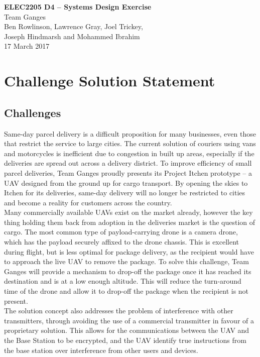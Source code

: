 \documentclass[a4paper,11pt]{article}
\begin{document}
  
\begin{center}
{\Large{\textbf{ELEC2205 D4 -- Systems Design Exercise}}} \\ [\baselineskip]
Team Ganges \\
Ben Rowlinson, Lawrence Gray, Joel Trickey,\\ Joseph Hindmarsh and Mohammed Ibrahim\\
17 March 2017\\
\end{center}

\tableofcontents
\newpage

\listoffigures
\newpage

\section{Challenge Solution Statement}
\subsection{Challenges}
Same-day parcel delivery is a difficult proposition for many businesses, even those that restrict the service to large cities. The current solution of couriers using vans and motorcycles is inefficient due to congestion in built up areas, especially if the deliveries are spread out across a delivery district. To improve efficiency of small parcel deliveries, Team Ganges proudly presents its Project Itchen prototype – a UAV designed from the ground up for cargo transport. By opening the skies to Itchen for its deliveries, same-day delivery will no longer be restricted to cities and become a reality for customers across the country.\\ 
Many commercially available UAVs exist on the market already, however the key thing holding them back from adoption in the deliveries market is the question of cargo. The most common type of payload-carrying drone is a camera drone, which has the payload securely affixed to the drone chassis. This is excellent during flight, but is less optimal for package delivery, as the recipient would have to approach the live UAV to remove the package. To solve this challenge, Team Ganges will provide a mechanism to drop-off the package once it has reached its destination and is at a low enough altitude. This will reduce the turn-around time of the drone and allow it to drop-off the package when the recipient is not present.\\
The solution concept also addresses the problem of interference with other transmitters, through avoiding the use of a commercial transmitter in favour of a proprietary solution. This allows for the communications between the UAV and the Base Station to be encrypted, and the UAV identify true instructions from the base station over interference from other users and devices.\\
\newpage
\end{document}
